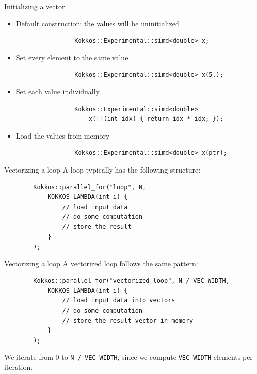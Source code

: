 \documentclass[
    aspectratio=169,
    \createHandout
]{beamer}
\begin{document}
\begin{frame}[fragile]{Initializing a vector}
    \begin{itemize}
        \item Default construction: the values will be uninitialized
            \vspace{-5pt}
            \begin{verbatim}
                Kokkos::Experimental::simd<double> x;
            \end{verbatim}
        \item Set every element to the same value
            \vspace{-5pt}
            \begin{verbatim}
                Kokkos::Experimental::simd<double> x(5.);
            \end{verbatim}
        \item Set each value individually
        \vspace{-5pt}
            \begin{verbatim}
                Kokkos::Experimental::simd<double>
                    x([](int idx) { return idx * idx; });
            \end{verbatim}
        \item Load the values from memory
        \vspace{-5pt}
            \begin{verbatim}
                Kokkos::Experimental::simd<double> x(ptr);
            \end{verbatim}
    \end{itemize}
\end{frame}

\begin{frame}[fragile]{Vectorizing a loop}
    A loop typically has the following structure:
    \begin{verbatim}
        Kokkos::parallel_for("loop", N,
            KOKKOS_LAMBDA(int i) {
                // load input data
                // do some computation
                // store the result
            }
        );
    \end{verbatim}
\end{frame}

\begin{frame}[fragile]{Vectorizing a loop}
    A vectorized loop follows the same pattern:
    \begin{verbatim}
        Kokkos::parallel_for("vectorized loop", N / VEC_WIDTH,
            KOKKOS_LAMBDA(int i) {
                // load input data into vectors
                // do some computation
                // store the result vector in memory
            }
        );
    \end{verbatim}

     We iterate from 0 to \texttt{N / VEC\_WIDTH}, since we compute \texttt{VEC\_WIDTH} elements per iteration.
\end{frame}
\end{document}
